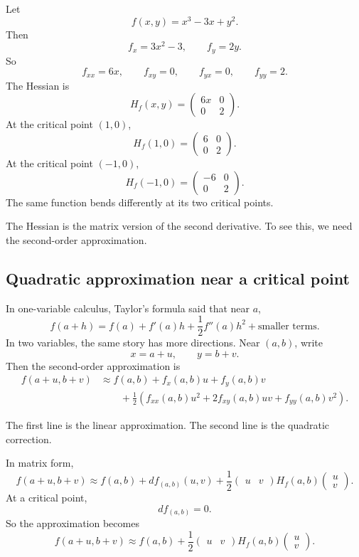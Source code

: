 \begin{example}
Let
\[
    f(x,y)=x^3-3x+y^2.
\]
Then
\[
    f_x=3x^2-3,
    \qquad
    f_y=2y.
\]
So
\[
    f_{xx}=6x,
    \qquad
    f_{xy}=0,
    \qquad
    f_{yx}=0,
    \qquad
    f_{yy}=2.
\]
The Hessian is
\[
    H_f(x,y)
    =
    \begin{pmatrix}
        6x & 0\\
        0 & 2
    \end{pmatrix}.
\]
At the critical point \((1,0)\),
\[
    H_f(1,0)
    =
    \begin{pmatrix}
        6 & 0\\
        0 & 2
    \end{pmatrix}.
\]
At the critical point \((-1,0)\),
\[
    H_f(-1,0)
    =
    \begin{pmatrix}
        -6 & 0\\
        0 & 2
    \end{pmatrix}.
\]
The same function bends differently at its two critical points.
\end{example}

The Hessian is the matrix version of the second derivative.  To see this, we need the
second-order approximation.

\subsection{Quadratic approximation near a critical point}

In one-variable calculus, Taylor's formula said that near \(a\),
\[
    f(a+h)
    =
    f(a)+f'(a)h+\frac12f''(a)h^2+\text{smaller terms}.
\]
In two variables, the same story has more directions.  Near \((a,b)\), write
\[
    x=a+u,
    \qquad
    y=b+v.
\]
Then the second-order approximation is
\[
\begin{aligned}
f(a+u,b+v)
&\approx
f(a,b)
+
f_x(a,b)u
+
f_y(a,b)v\\
&\qquad
+
\frac12
\left(
f_{xx}(a,b)u^2
+
2f_{xy}(a,b)uv
+
f_{yy}(a,b)v^2
\right).
\end{aligned}
\]

The first line is the linear approximation.  The second line is the quadratic correction.

In matrix form,
\[
\boxed{
f(a+u,b+v)
\approx
f(a,b)
+
df_{(a,b)}(u,v)
+
\frac12
\begin{pmatrix}u&v\end{pmatrix}
H_f(a,b)
\begin{pmatrix}u\\v\end{pmatrix}.
}
\]
At a critical point,
\[
    df_{(a,b)}=0.
\]
So the approximation becomes
\[
\boxed{
f(a+u,b+v)
\approx
f(a,b)
+
\frac12
\begin{pmatrix}u&v\end{pmatrix}
H_f(a,b)
\begin{pmatrix}u\\v\end{pmatrix}.
}
\]

